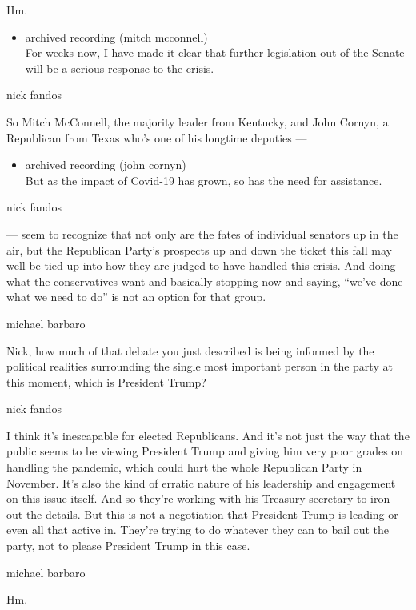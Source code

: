 Hm.

\begin{itemize}
\tightlist
\item
  archived recording (mitch mcconnell)\\
  For weeks now, I have made it clear that further legislation out of
  the Senate will be a serious response to the crisis.
\end{itemize}

nick fandos

So Mitch McConnell, the majority leader from Kentucky, and John Cornyn,
a Republican from Texas who's one of his longtime deputies ---

\begin{itemize}
\tightlist
\item
  archived recording (john cornyn)\\
  But as the impact of Covid-19 has grown, so has the need for
  assistance.
\end{itemize}

nick fandos

--- seem to recognize that not only are the fates of individual senators
up in the air, but the Republican Party's prospects up and down the
ticket this fall may well be tied up into how they are judged to have
handled this crisis. And doing what the conservatives want and basically
stopping now and saying, ``we've done what we need to do'' is not an
option for that group.

michael barbaro

Nick, how much of that debate you just described is being informed by
the political realities surrounding the single most important person in
the party at this moment, which is President Trump?

nick fandos

I think it's inescapable for elected Republicans. And it's not just the
way that the public seems to be viewing President Trump and giving him
very poor grades on handling the pandemic, which could hurt the whole
Republican Party in November. It's also the kind of erratic nature of
his leadership and engagement on this issue itself. And so they're
working with his Treasury secretary to iron out the details. But this is
not a negotiation that President Trump is leading or even all that
active in. They're trying to do whatever they can to bail out the party,
not to please President Trump in this case.

michael barbaro

Hm.

